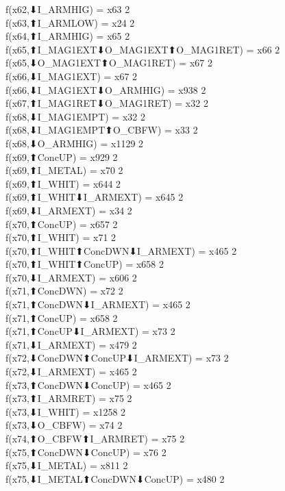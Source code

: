 f(x62,⬇I_ARMHIG) = x63 {2} \\
f(x63,⬆I_ARMLOW) = x24 {2} \\
f(x64,⬆I_ARMHIG) = x65 {2} \\
f(x65,⬆I_MAG1EXT⬇O_MAG1EXT⬆O_MAG1RET) = x66 {2} \\
f(x65,⬇O_MAG1EXT⬆O_MAG1RET) = x67 {2} \\
f(x66,⬇I_MAG1EXT) = x67 {2} \\
f(x66,⬇I_MAG1EXT⬇O_ARMHIG) = x938 {2} \\
f(x67,⬆I_MAG1RET⬇O_MAG1RET) = x32 {2} \\
f(x68,⬇I_MAG1EMPT) = x32 {2} \\
f(x68,⬇I_MAG1EMPT⬆O_CBFW) = x33 {2} \\
f(x68,⬇O_ARMHIG) = x1129 {2} \\
f(x69,⬆ConcUP) = x929 {2} \\
f(x69,⬆I_METAL) = x70 {2} \\
f(x69,⬆I_WHIT) = x644 {2} \\
f(x69,⬆I_WHIT⬇I_ARMEXT) = x645 {2} \\
f(x69,⬇I_ARMEXT) = x34 {2} \\
f(x70,⬆ConcUP) = x657 {2} \\
f(x70,⬆I_WHIT) = x71 {2} \\
f(x70,⬆I_WHIT⬆ConcDWN⬇I_ARMEXT) = x465 {2} \\
f(x70,⬆I_WHIT⬆ConcUP) = x658 {2} \\
f(x70,⬇I_ARMEXT) = x606 {2} \\
f(x71,⬆ConcDWN) = x72 {2} \\
f(x71,⬆ConcDWN⬇I_ARMEXT) = x465 {2} \\
f(x71,⬆ConcUP) = x658 {2} \\
f(x71,⬆ConcUP⬇I_ARMEXT) = x73 {2} \\
f(x71,⬇I_ARMEXT) = x479 {2} \\
f(x72,⬇ConcDWN⬆ConcUP⬇I_ARMEXT) = x73 {2} \\
f(x72,⬇I_ARMEXT) = x465 {2} \\
f(x73,⬆ConcDWN⬇ConcUP) = x465 {2} \\
f(x73,⬆I_ARMRET) = x75 {2} \\
f(x73,⬇I_WHIT) = x1258 {2} \\
f(x73,⬇O_CBFW) = x74 {2} \\
f(x74,⬆O_CBFW⬆I_ARMRET) = x75 {2} \\
f(x75,⬆ConcDWN⬇ConcUP) = x76 {2} \\
f(x75,⬇I_METAL) = x811 {2} \\
f(x75,⬇I_METAL⬆ConcDWN⬇ConcUP) = x480 {2} \\
